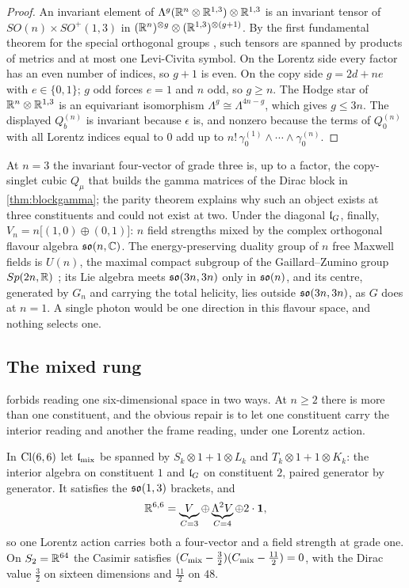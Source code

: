 \begin{proof}
An invariant element of $\Lambda^g(\mathbb{R}^n\otimes\mathbb{R}^{1,3})\otimes\mathbb{R}^{1,3}$ is an invariant tensor of $SO(n)\times SO^+(1,3)$ in
$(\mathbb{R}^n)^{\otimes g}\otimes(\mathbb{R}^{1,3})^{\otimes(g+1)}$. By the first fundamental theorem for the special orthogonal groups \cite{Weyl39},
such tensors are spanned by products of metrics and at most one Levi-Civita symbol. On the Lorentz side every factor has an even number
of indices, so $g+1$ is even. On the copy side $g=2d+ne$ with $e\in\{0,1\}$; $g$ odd forces $e=1$ and $n$ odd, so $g\ge n$. The Hodge
star of $\mathbb{R}^n\otimes\mathbb{R}^{1,3}$ is an equivariant isomorphism $\Lambda^g\cong\Lambda^{4n-g}$, which gives $g\le3n$. The displayed
$Q^{(n)}_b$ is invariant because $\epsilon$ is, and nonzero because the terms of $Q^{(n)}_0$ with all Lorentz indices equal to $0$
add up to $n!\,\gamma^{(1)}_0\wedge\cdots\wedge\gamma^{(n)}_0$.
\end{proof}

At $n=3$ the invariant four-vector of grade three is, up to a factor, the copy-singlet cubic $Q_\mu$ that builds the gamma matrices of
the Dirac block in \cref{thm:blockgamma}; the parity theorem explains why such an object exists at three constituents and could not
exist at two. Under the diagonal $\mathfrak l_G$, finally, $V_n=n\bigl[(1,0)\oplus(0,1)\bigr]$: $n$ field strengths mixed by the complex orthogonal
flavour algebra $\mathfrak{so}(n,\mathbb{C})$. The energy-preserving duality group of $n$ free Maxwell fields is $U(n)$, the maximal compact subgroup of
the Gaillard--Zumino group $Sp(2n,\mathbb{R})$ \cite{GaillardZumino81}; its Lie algebra meets $\mathfrak{so}(3n,3n)$ only in $\mathfrak{so}(n)$, and its centre,
generated by $G_n$ and carrying the total helicity, lies outside $\mathfrak{so}(3n,3n)$, as $G$ does at $n=1$. A single photon would be one
direction in this flavour space, and nothing selects one.

\subsection{The mixed rung}
\label{sec:mixed}

 forbids reading one six-dimensional space in two ways. At $n\ge2$ there is more than one constituent, and the
obvious repair is to let one constituent carry the interior reading and another the frame reading, under one Lorentz action.

\begin{proposition}
\label{prop:mixed}
In $\mathrm{Cl}(6,6)$ let $\mathfrak l_{\rm mix}$ be spanned by $S_k\otimes1+1\otimes L_k$ and $T_k\otimes1+1\otimes K_k$: the interior algebra on
constituent $1$ and $\mathfrak l_G$ on constituent $2$, paired generator by generator. It satisfies the $\mathfrak{so}(1,3)$ brackets, and
\[
\mathbb{R}^{6,6}=\underbrace{V}_{C=3}\oplus\underbrace{\Lambda^2V}_{C=4}\oplus2\cdot\mathbf1 ,
\]
so one Lorentz action carries both a four-vector and a field strength at grade one. On $S_2=\mathbb{R}^{64}$ the Casimir satisfies
$(C_{\rm mix}-\tfrac32)(C_{\rm mix}-\tfrac{11}2)=0$, with the Dirac value $\tfrac32$ on sixteen dimensions and $\tfrac{11}2$ on $48$.
\end{proposition}

